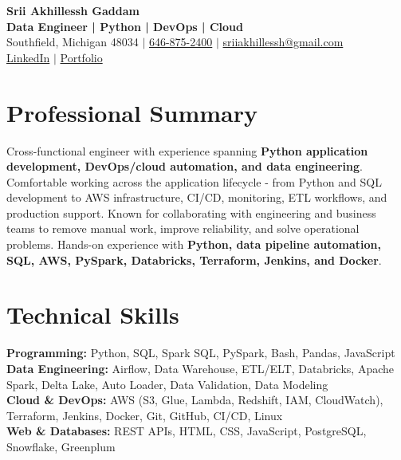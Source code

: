\documentclass[letterpaper,10pt]{article}
\begin{document}
\fontsize{9.35pt}{10.45pt}\selectfont

\begin{center}
    {\LARGE \textbf{Srii Akhillessh Gaddam}} \\[-1pt]
    \textbf{Data Engineer | Python | DevOps | Cloud} \\[2pt]
    Southfield, Michigan 48034 $|$
    \href{tel:6468752400}{646-875-2400} $|$
    \href{mailto:sriiakhillessh@gmail.com}{sriiakhillessh@gmail.com} \\[1pt]
    \href{https://www.linkedin.com/in/srii-akhiilessh-gaddam-b48668191/}{LinkedIn} $|$
    \href{https://sriiakhillesshg.github.io/portfolio/}{Portfolio}
\end{center}
\vspace{-8pt}

\section{Professional Summary}
\small{Cross-functional engineer with experience spanning \textbf{Python application development, DevOps/cloud automation, and data engineering}. Comfortable working across the application lifecycle - from Python and SQL development to AWS infrastructure, CI/CD, monitoring, ETL workflows, and production support. Known for collaborating with engineering and business teams to remove manual work, improve reliability, and solve operational problems. Hands-on experience with \textbf{Python, data pipeline automation, SQL, AWS, PySpark, Databricks, Terraform, Jenkins, and Docker}.}

\section{Technical Skills}
\small{
\textbf{Programming:} Python, SQL, Spark SQL, PySpark, Bash, Pandas, JavaScript \\
\textbf{Data Engineering:} Airflow, Data Warehouse, ETL/ELT, Databricks, Apache Spark, Delta Lake, Auto Loader, Data Validation, Data Modeling \\
\textbf{Cloud \& DevOps:} AWS (S3, Glue, Lambda, Redshift, IAM, CloudWatch), Terraform, Jenkins, Docker, Git, GitHub, CI/CD, Linux \\
\textbf{Web \& Databases:} REST APIs, HTML, CSS, JavaScript, PostgreSQL, Snowflake, Greenplum
}
\end{document}
